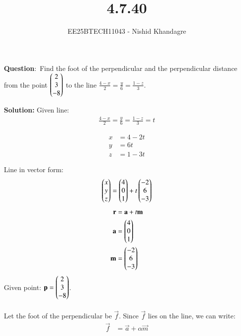 \documentclass[journal]{IEEEtran}
\title{4.7.40}
\author{EE25BTECH11043 - Nishid Khandagre} %
\begin{document}
\maketitle

\renewcommand{\thefigure}{\theenumi}
\renewcommand{\thetable}{\theenumi}


\textbf{Question}:\
Find the foot of the perpendicular and the perpendicular distance from the point $\begin{pmatrix}2 \\ 3 \\ -8\end{pmatrix}$ to the line $\frac{4-x}{2}=\frac{y}{6}=\frac{1-z}{3}$.

\textbf{Solution: }
Given line: 
\begin{align}
\frac{4-x}{2}=\frac{y}{6}=\frac{1-z}{3}=t
\end{align}

\begin{align}
x &= 4-2t \\
y &= 6t \\
z &= 1-3t
\end{align}

Line in vector form:
\begin{align}
\begin{pmatrix}x \\ y \\ z\end{pmatrix} = \begin{pmatrix}4 \\ 0 \\ 1\end{pmatrix} + t \begin{pmatrix}-2 \\ 6 \\ -3\end{pmatrix}
\end{align}
\begin{align}
\mathbf{r} &= \mathbf{a} + t \mathbf{m} \\
\mathbf{a} &= \begin{pmatrix}4 \\ 0 \\ 1\end{pmatrix} \\
\mathbf{m} &= \begin{pmatrix}-2 \\ 6 \\ -3\end{pmatrix}
\end{align}
Given point: $\mathbf{p} = \begin{pmatrix}2 \\ 3 \\ -8\end{pmatrix}$.\\ \\


Let the foot of the perpendicular be $\vec{f}$. Since $\vec{f}$ lies on the line, we can write:
\begin{align}
\vec{f} &= \vec{a} + \alpha\vec{m}
\end{align}
\end{document}
